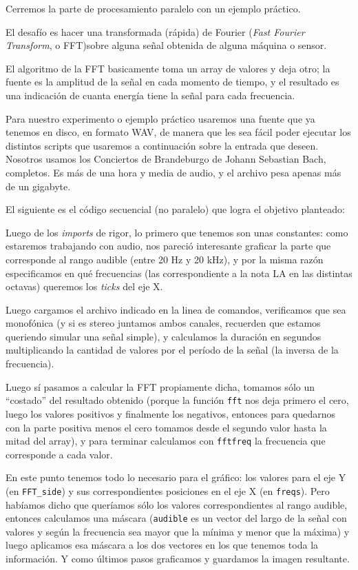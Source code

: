 Cerremos la parte de procesamiento paralelo con un ejemplo práctico. 

El desafío es hacer una transformada (rápida) de Fourier (\textit{Fast Fourier Transform}, o FFT)sobre alguna señal obtenida de alguna máquina o sensor. 

\begin{info}
El algoritmo de la FFT basicamente toma un array de valores y deja otro; la fuente es la amplitud de la señal en cada momento de tiempo, y el resultado es una indicación de cuanta energía tiene la señal para cada frecuencia.
\end{info}

Para nuestro experimento o ejemplo práctico usaremos una fuente que ya tenemos en disco, en formato WAV, de manera que les sea fácil poder ejecutar los distintos scripts que usaremos a continuación sobre la entrada que deseen. Nosotros usamos los Conciertos de Brandeburgo de Johann Sebastian Bach, completos. Es más de una hora y media de audio, y el archivo pesa apenas más de un gigabyte.

El siguiente es el código secuencial (no paralelo) que logra el objetivo planteado:


Luego de los \textit{imports} de rigor, lo primero que tenemos son unas constantes: como estaremos trabajando con audio, nos pareció interesante graficar la parte que corresponde al rango audible (entre 20 Hz y 20 kHz), y por la misma razón especificamos en qué frecuencias (las correspondiente a la nota LA en las distintas octavas) queremos los \textit{ticks} del eje X.

Luego cargamos el archivo indicado en la linea de comandos, verificamos que sea monofónica (y si es stereo juntamos ambos canales, recuerden que estamos queriendo simular una señal simple), y calculamos la duración en segundos multiplicando la cantidad de valores por el período de la señal (la inversa de la frecuencia).

Luego sí pasamos a calcular la FFT propiamente dicha, tomamos sólo un ``costado'' del resultado obtenido (porque la función \texttt{fft} nos deja primero el cero, luego los valores positivos y finalmente los negativos, entonces para quedarnos con la parte positiva menos el cero tomamos desde el segundo valor hasta la mitad del array), y para terminar calculamos con \texttt{fftfreq} la frecuencia que corresponde a cada valor.

En este punto tenemos todo lo necesario para el gráfico: los valores para el eje Y (en \texttt{FFT\_side}) y sus correspondientes posiciones en el eje X (en \texttt{freqs}). Pero habíamos dicho que queríamos sólo los valores correspondientes al rango audible, entonces calculamos una máscara (\texttt{audible} es un vector del largo de la señal con valores  y  según la frecuencia sea mayor que la mínima y menor que la máxima) y luego aplicamos esa máscara a los dos vectores en los que tenemos toda la información. Y como últimos pasos graficamos y guardamos la imagen resultante.

